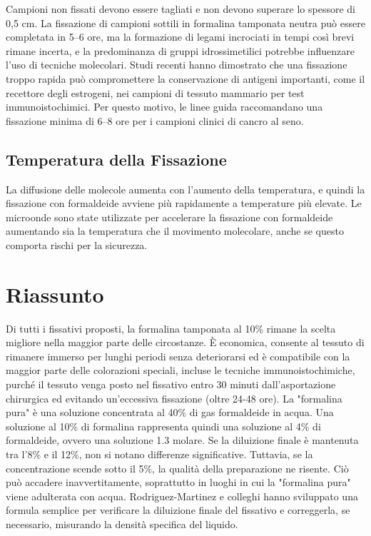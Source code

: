 Campioni non fissati devono essere tagliati e non devono superare lo spessore di 0,5 cm. La fissazione di campioni sottili in formalina tamponata neutra può essere completata in 5–6 ore, ma la formazione di legami incrociati in tempi così brevi rimane incerta, e la predominanza di gruppi idrossimetilici potrebbe influenzare l'uso di tecniche molecolari. Studi recenti hanno dimostrato che una fissazione troppo rapida può compromettere la conservazione di antigeni importanti, come il recettore degli estrogeni, nei campioni di tessuto mammario per test immunoistochimici. Per questo motivo, le linee guida raccomandano una fissazione minima di 6–8 ore per i campioni clinici di cancro al seno.

\subsection{Temperatura della Fissazione}
La diffusione delle molecole aumenta con l'aumento della temperatura, e quindi la fissazione con formaldeide avviene più rapidamente a temperature più elevate. Le microonde sono state utilizzate per accelerare la fissazione con formaldeide aumentando sia la temperatura che il movimento molecolare, anche se questo comporta rischi per la sicurezza.

\section {Riassunto} 


Di tutti i fissativi proposti, la formalina tamponata al 10\% rimane la scelta migliore nella maggior parte delle circostanze. È economica, consente al tessuto di rimanere immerso per lunghi periodi senza deteriorarsi ed è compatibile con la maggior parte delle colorazioni speciali, incluse le tecniche immunoistochimiche, purché il tessuto venga posto nel fissativo entro 30 minuti dall'asportazione chirurgica ed evitando un’eccessiva fissazione (oltre 24-48 ore). La "formalina pura" è una soluzione concentrata al 40\% di gas formaldeide in acqua. Una soluzione al 10\% di formalina rappresenta quindi una soluzione al 4\% di formaldeide, ovvero una soluzione 1.3 molare. Se la diluizione finale è mantenuta tra l'8\% e il 12\%, non si notano differenze significative. Tuttavia, se la concentrazione scende sotto il 5\%, la qualità della preparazione ne risente. Ciò può accadere inavvertitamente, soprattutto in luoghi in cui la "formalina pura" viene adulterata con acqua. Rodriguez-Martinez e colleghi hanno sviluppato una formula semplice per verificare la diluizione finale del fissativo e correggerla, se necessario, misurando la densità specifica del liquido.


